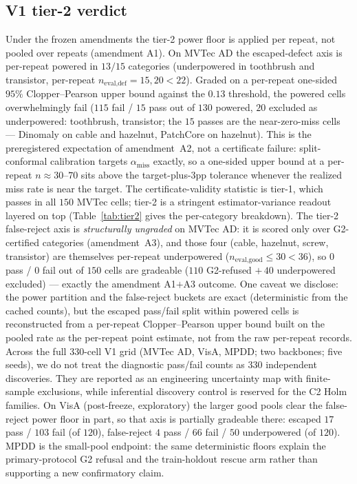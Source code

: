 \documentclass[preprint,11pt]{elsarticle}
\begin{document}
\subsection{V1 tier-2 verdict}
\label{sec:tier2verdict}

Under the frozen amendments the tier-2 power floor is applied per repeat, not pooled over repeats
(amendment A1). On MVTec AD the escaped-defect axis is per-repeat powered in $13/15$ categories
(underpowered in toothbrush and transistor, per-repeat $n_{\text{eval,def}}=15,20<22$). Graded on a
per-repeat one-sided $95\%$ Clopper--Pearson upper bound against the $0.13$ threshold, the powered
cells overwhelmingly fail ($115$ fail / $15$ pass out of $130$ powered, $20$ excluded as
underpowered: toothbrush, transistor; the $15$ passes are the near-zero-miss cells --- Dinomaly on
cable and hazelnut, PatchCore on hazelnut). This is the preregistered expectation of amendment~A2,
not a certificate failure: split-conformal calibration targets $\alpha_{\text{miss}}$ exactly, so a
one-sided upper bound at a per-repeat $n\approx30$--$70$ sits above the target-plus-$3$pp tolerance
whenever the realized miss rate is near the target. The certificate-validity statistic is tier-1,
which passes in all $150$ MVTec cells; tier-2 is a stringent estimator-variance readout layered on
top (Table~\ref{tab:tier2} gives the per-category breakdown). The tier-2 false-reject axis is
\emph{structurally ungraded} on
MVTec AD: it is scored only over G2-certified categories (amendment~A3), and those four (cable,
hazelnut, screw, transistor) are themselves per-repeat underpowered ($n_{\text{eval,good}}\le30<36$),
so $0$ pass / $0$ fail out of $150$ cells are gradeable ($110$ G2-refused $+\,40$ underpowered
excluded) --- exactly the amendment A1$+$A3 outcome. One caveat we disclose: the
power partition and the false-reject buckets are exact (deterministic from the cached counts), but
the escaped pass/fail split within powered cells is reconstructed from a per-repeat Clopper--Pearson
upper bound built on the pooled rate as the per-repeat point estimate, not from the raw per-repeat
records. Across the full $330$-cell V1 grid (MVTec AD, VisA, MPDD; two backbones; five seeds), we do
not treat the diagnostic pass/fail counts as $330$ independent discoveries. They are reported as an
engineering uncertainty map with finite-sample exclusions, while inferential discovery control is
reserved for the C2 Holm families. On VisA (post-freeze, exploratory) the larger good pools clear the
false-reject power floor in part, so that axis is partially gradeable there: escaped $17$ pass /
$103$ fail (of $120$), false-reject $4$ pass / $66$ fail / $50$ underpowered (of $120$). MPDD is the
small-pool endpoint: the same deterministic floors explain the primary-protocol G2 refusal and the
train-holdout rescue arm rather than supporting a new confirmatory claim.
\end{document}
